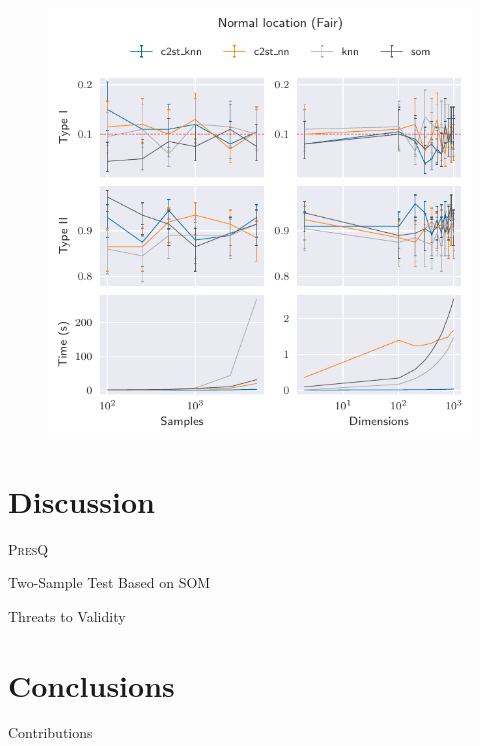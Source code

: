 \documentclass[10pt]{beamer}
\newcommand{\PresQ}[0]{\textsc{PresQ}\xspace}
\begin{document}
\begin{frame}{}
\begin{figure}
    \centering
    \includegraphics[height=\textheight]{normal_location_fair.pdf}
\end{figure}
\end{frame}

\section{Discussion}

\begin{frame}{\PresQ}
\end{frame}

\begin{frame}{Two-Sample Test Based on SOM}
\end{frame}

\begin{frame}{Threats to Validity}
\end{frame}

\section{Conclusions}

\begin{frame}{Contributions}
\end{frame}
\end{document}
